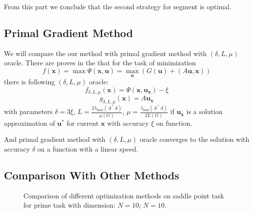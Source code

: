\documentclass[12pt]{article}
\begin{document}
From this part we сonclude that the second strategy for segment is optimal.


\subsection{Primal Gradient Method}
\label{PGM}

We will compare the our method with primal gradient method with $(\delta, L,\mu)$ oracle. There are proves in the \cite{PGM} that for the task of minimization 
$$f(\textbf{x}) = \max \Psi(\textbf{x}, \textbf{u}) =\max_\textbf{u}\left(G(\textbf{u})+(A\textbf{u}, \textbf{x})\right)$$
there is following $(\delta, L,\mu)$ oracle:
$$f_{\delta, L,\mu}(\textbf{x}) = \Psi(\textbf{x}, \textbf{u}_\textbf{x}) - \xi$$
$$g_{\delta, L,\mu}(\textbf{x}) = A\textbf{u}_\textbf{x}$$
with parameters $\delta = 3\xi$, $L = \frac{2\lambda_{\max}(A^\top A)}{\mu(G)}$, $\mu = \frac{\lambda_{\min}(A^\top A)}{2L(G)}$ if $\textbf{u}_\textbf{x}$ is a solution approximation of $\textbf{u}^*$ for current $\textbf{x}$ with accuracy $\xi$ on function.

And primal gradient method with $(\delta, L,\mu)$ oracle converges to the solution with accuracy $\delta$ on a function with a linear speed.

\subsection{Comparison With Other Methods}


\begin{figure}[h!]  
\vspace{-4ex} \centering {}  
\hspace{1.2ex}
\caption{Comparison of different optimization methods on saddle point task for prime task with dimension:   $N=10$;  $N=10$.} \label{fig:image}
\end{figure}
\end{document}
